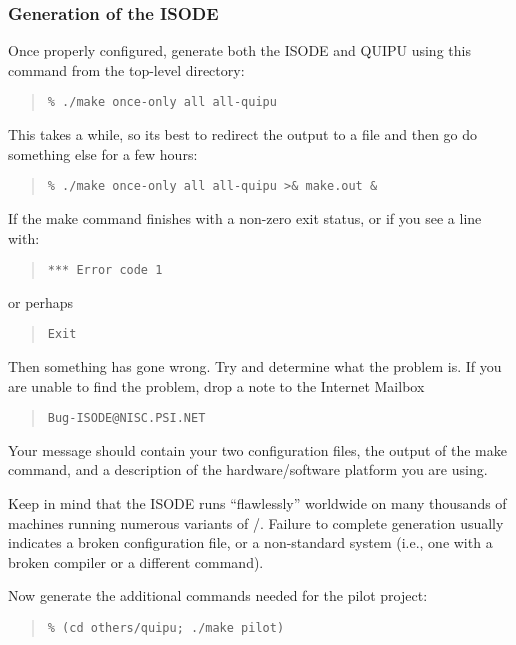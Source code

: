 \subsubsection	{Generation of the ISODE}
Once properly configured,
generate both the ISODE and QUIPU using this command from the top-level
directory:
\begin{quote}\small\begin{verbatim}
% ./make once-only all all-quipu
\end{verbatim}\end{quote}
This takes a while,
so its best to redirect the output to a file and then go do something else for
a few hours:
\begin{quote}\small\begin{verbatim}
% ./make once-only all all-quipu >& make.out &
\end{verbatim}\end{quote}

If the make command finishes with a non-zero exit status,
or if you see a line with:
\begin{quote}\small\begin{verbatim}
*** Error code 1
\end{verbatim}\end{quote}
or perhaps
\begin{quote}\small\begin{verbatim}
Exit
\end{verbatim}\end{quote}
Then something has gone wrong.
Try and determine what the problem is.
If you are unable to find the problem,
drop a note to the Internet Mailbox
\begin{quote}\begin{verbatim}
Bug-ISODE@NISC.PSI.NET
\end{verbatim}\end{quote}
Your message should contain your two configuration files,
the output of the make command,
and a description of the hardware/software platform you are using.

Keep in mind that the ISODE runs ``flawlessly'' worldwide on many thousands of
machines running numerous variants of \unix/.
Failure to complete generation usually indicates a broken configuration file,
or a non-standard system
(i.e., one with a broken compiler or a different  command).

Now generate the additional commands needed for the pilot project:
\begin{quote}\small\begin{verbatim}
% (cd others/quipu; ./make pilot)
\end{verbatim}\end{quote}

